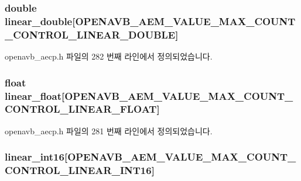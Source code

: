 \subsubsection[{\texorpdfstring{linear\+\_\+double}{linear_double}}]{\setlength{\rightskip}{0pt plus 5cm}double linear\+\_\+double\mbox{[}{\bf O\+P\+E\+N\+A\+V\+B\+\_\+\+A\+E\+M\+\_\+\+V\+A\+L\+U\+E\+\_\+\+M\+A\+X\+\_\+\+C\+O\+U\+N\+T\+\_\+\+C\+O\+N\+T\+R\+O\+L\+\_\+\+L\+I\+N\+E\+A\+R\+\_\+\+D\+O\+U\+B\+LE}\mbox{]}}\hypertarget{structopenavb__aecp__response__data__get__control__t_a4ac1f60ad606687e4dd294549ff9db69}{}\label{structopenavb__aecp__response__data__get__control__t_a4ac1f60ad606687e4dd294549ff9db69}


openavb\+\_\+aecp.\+h 파일의 282 번째 라인에서 정의되었습니다.

\subsubsection[{\texorpdfstring{linear\+\_\+float}{linear_float}}]{\setlength{\rightskip}{0pt plus 5cm}float linear\+\_\+float\mbox{[}{\bf O\+P\+E\+N\+A\+V\+B\+\_\+\+A\+E\+M\+\_\+\+V\+A\+L\+U\+E\+\_\+\+M\+A\+X\+\_\+\+C\+O\+U\+N\+T\+\_\+\+C\+O\+N\+T\+R\+O\+L\+\_\+\+L\+I\+N\+E\+A\+R\+\_\+\+F\+L\+O\+AT}\mbox{]}}\hypertarget{structopenavb__aecp__response__data__get__control__t_a5a346af0ca505581807d6ed0ec84a85e}{}\label{structopenavb__aecp__response__data__get__control__t_a5a346af0ca505581807d6ed0ec84a85e}


openavb\+\_\+aecp.\+h 파일의 281 번째 라인에서 정의되었습니다.

\subsubsection[{\texorpdfstring{linear\+\_\+int16}{linear_int16}}]{ linear\+\_\+int16\mbox{[}{\bf O\+P\+E\+N\+A\+V\+B\+\_\+\+A\+E\+M\+\_\+\+V\+A\+L\+U\+E\+\_\+\+M\+A\+X\+\_\+\+C\+O\+U\+N\+T\+\_\+\+C\+O\+N\+T\+R\+O\+L\+\_\+\+L\+I\+N\+E\+A\+R\+\_\+\+I\+N\+T16}\mbox{]}}\hypertarget{structopenavb__aecp__response__data__get__control__t_a971e2e30fcd86963178d3445519eccf4}{}\label{structopenavb__aecp__response__data__get__control__t_a971e2e30fcd86963178d3445519eccf4}


